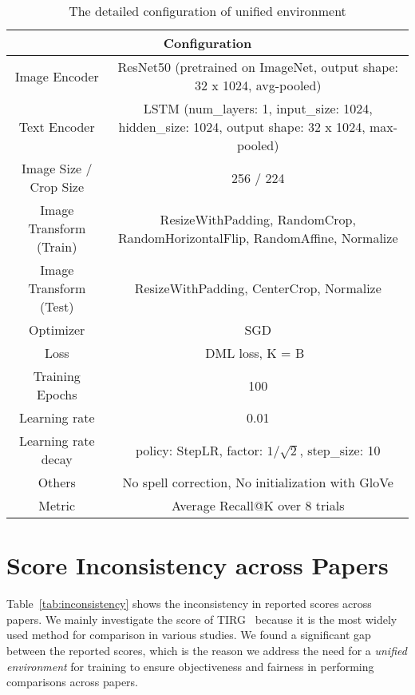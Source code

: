 \documentclass[10pt,twocolumn,letterpaper]{article}
\begin{document}
    \begin{table*}[t]
    \caption{The detailed configuration of unified environment}
    \centering
    \begin{adjustbox}{width=1.0\textwidth}
    \begin{tabular}{cc}
        \toprule
        \multicolumn{2}{c}{Configuration} \\
        \hline \hline
        Image Encoder & ResNet50 (pretrained on ImageNet, output shape: 32 x 1024, avg-pooled) \\
        Text Encoder & LSTM (num\_layers: 1, input\_size: 1024, hidden\_size: 1024, output shape: 32 x 1024, max-pooled) \\
        Image Size / Crop Size & 256 / 224 \\
        Image Transform (Train) & ResizeWithPadding, RandomCrop, RandomHorizontalFlip, RandomAffine, Normalize\\
        Image Transform (Test) & ResizeWithPadding, CenterCrop, Normalize \\
        Optimizer & SGD \\
        Loss & DML loss, K = B~\cite{vo2019composing} \\
        Training Epochs & 100 \\
        Learning rate & 0.01 \\
        Learning rate decay & policy: StepLR, factor: $1/\sqrt{2}$, step\_size: 10 \\
        Others & No spell correction, No initialization with GloVe  \\
        Metric & Average Recall@K over 8 trials  \\
        \bottomrule
    \end{tabular}
    \end{adjustbox}
    \label{tab:training_standard}
\end{table*}
    
\section{Score Inconsistency across Papers}
Table~\ref{tab:inconsistency} shows the inconsistency in reported scores across papers. We mainly investigate the score of TIRG~\cite{vo2019composing} because it is the most widely used method for comparison in various studies. We found a significant gap between the reported scores, which is the reason we address the need for a \textit{unified environment} for training to ensure objectiveness and fairness in performing comparisons across papers.
\end{document}

